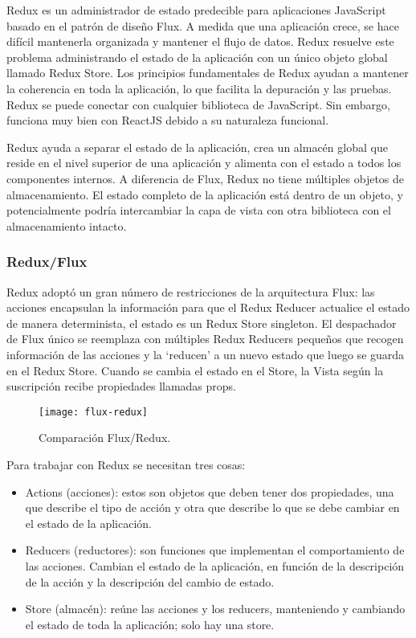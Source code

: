 Redux es un administrador de estado predecible para aplicaciones JavaScript basado en el patrón de diseño Flux. A medida que una aplicación crece, se hace difícil mantenerla organizada y mantener el flujo de datos. Redux resuelve este problema administrando el estado de la aplicación con un único objeto global llamado Redux Store. Los principios fundamentales de Redux ayudan a mantener la coherencia en toda la aplicación, lo que facilita la depuración y las pruebas. Redux se puede conectar con cualquier biblioteca de JavaScript. Sin embargo, funciona muy bien con ReactJS debido a su naturaleza funcional.
\vspace{0.8cm}

Redux ayuda a separar el estado de la aplicación, crea un almacén global que reside en el nivel superior de una aplicación y alimenta con el estado a todos los componentes internos. A diferencia de Flux, Redux no tiene múltiples objetos de almacenamiento. El estado completo de la aplicación está dentro de un objeto, y potencialmente podría intercambiar la capa de vista con otra biblioteca con el almacenamiento intacto.

\subsubsection{Redux/Flux}
Redux adoptó un gran número de restricciones de la arquitectura Flux: las acciones encapsulan la información para que el Redux Reducer actualice el estado de manera determinista, el estado es un Redux Store \gls{singleton}. El despachador de Flux único se reemplaza con múltiples Redux Reducers pequeños que recogen información de las acciones y la `reducen' a un nuevo estado que luego se guarda en el Redux Store. Cuando se cambia el estado en el Store, la Vista según la suscripción recibe propiedades llamadas props.
\vspace{0.8cm}

\begin{figure}[H]
  \centering
  \texttt{[image: flux-redux]}
  \caption{Comparación Flux/Redux.}
\end{figure}
\vspace{0.8cm}

Para trabajar con Redux se necesitan tres cosas:
\begin{itemize}
  \item Actions (acciones): estos son objetos que deben tener dos propiedades, una que describe el tipo de acción y otra que describe lo que se debe cambiar en el estado de la aplicación.

  \item Reducers (reductores): son funciones que implementan el comportamiento de las acciones. Cambian el estado de la aplicación, en función de la descripción de la acción y la descripción del cambio de estado.

  \item Store (almacén): reúne las acciones y los reducers, manteniendo y cambiando el estado de toda la aplicación; solo hay una store.
\end{itemize}


